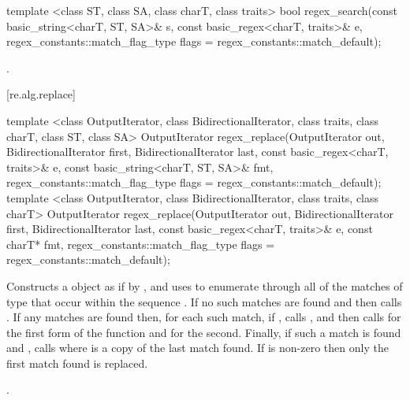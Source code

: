%
\begin{itemdecl}
template <class ST, class SA, class charT, class traits>
  bool regex_search(const basic_string<charT, ST, SA>& s,
                    const basic_regex<charT, traits>& e,
                    regex_constants::match_flag_type flags =
                      regex_constants::match_default); 
\end{itemdecl}

\begin{itemdescr}
\pnum\returns  {}.
\end{itemdescr}

[re.alg.replace]{}

%
\begin{itemdecl}
template <class OutputIterator, class BidirectionalIterator,
    class traits, class charT, class ST, class SA>
  OutputIterator 
  regex_replace(OutputIterator out,
                BidirectionalIterator first, BidirectionalIterator last,
                const basic_regex<charT, traits>& e,
                const basic_string<charT, ST, SA>& fmt,
                regex_constants::match_flag_type flags =
                  regex_constants::match_default);
template <class OutputIterator, class BidirectionalIterator,
    class traits, class charT>
  OutputIterator
  regex_replace(OutputIterator out,
                BidirectionalIterator first, BidirectionalIterator last,
                const basic_regex<charT, traits>& e,
                const charT* fmt,
                regex_constants::match_flag_type flags =
                  regex_constants::match_default);
\end{itemdecl}

\begin{itemdescr}
\pnum
{}%
%
\effects  Constructs a  object 
as if by , and uses  to enumerate through all
of the matches  of type  
that occur within the sequence . If no such
matches are found and  then calls .  If any matches are found then, for each such match,
if , calls 
, and
then calls 
for the first form of the function and
  for the second. Finally, if such a match
is found and ,
calls  where  is a copy of the last match
found. If  
is non-zero then only the first match found is replaced.

\pnum\returns  {}.
\end{itemdescr}

